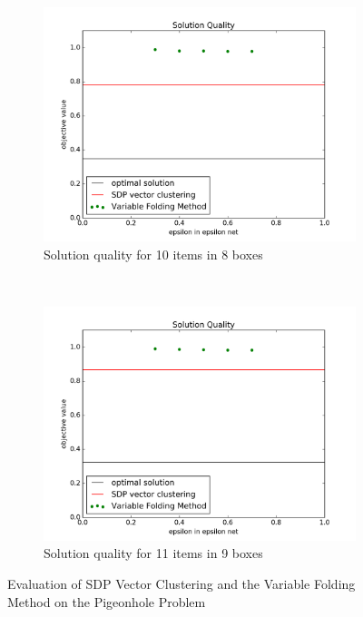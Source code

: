 \documentclass[11pt]{article} %
\begin{document}
\begin{figure}[h!]
	\begin{subfigure}[b]{0.45\textwidth}
	\centering
	\includegraphics[width=\textwidth]{solution_epsilon_n10m8}
	\caption{Solution quality for 10 items in 8 boxes}
	\label{n10m8}
	\end{subfigure}
	~
	\begin{subfigure}[b]{0.45\textwidth}
	\centering
	\includegraphics[width=\textwidth]{solution_epsilon_n11m9}
	\caption{Solution quality for 11 items in 9 boxes}
	\label{n11m9}
	\end{subfigure}
\caption{Evaluation of SDP Vector Clustering and the Variable Folding Method on the Pigeonhole Problem}
\label{pigeon}
\end{figure}
\end{document}
